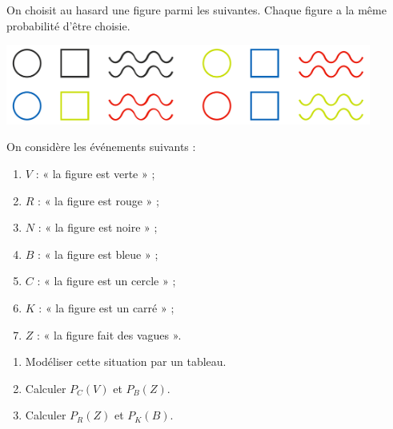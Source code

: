 \documentclass[a4paper,11pt,exos]{nsi} %
\begin{document}


\exo{}

On choisit au hasard une figure parmi les suivantes. Chaque figure a la même probabilité d'être choisie.
\begin{center}
	\includegraphics[width=12cm]{figures}
\end{center}
On considère les événements suivants :
\begin{enumerate}[label=\textbullet]
	\item 	$V$ : « la figure est verte » ;
	\item 	$R$ : « la figure est rouge » ;
	\item 	$N$ : « la figure est noire » ;
	\item 	$B$ : « la figure est bleue » ;
	\item 	$C$ : « la figure est un cercle » ;
	\item 	$K$ : « la figure est un carré » ;
	\item	$Z$ : « la figure fait des vagues ».
\end{enumerate}
\begin{enumerate}
	\item 	Modéliser cette situation par un tableau.
	\item 	Calculer $P_C(V)$ et $P_B(Z)$.
	\item	Calculer $P_R(Z)$ et $P_K(B)$.
\end{enumerate}
\end{document}
